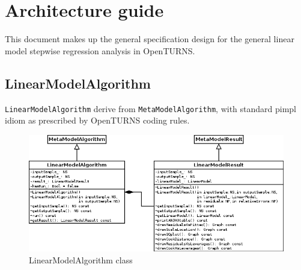 %

\section{Architecture guide}

This document makes up the general specification design for the general linear model stepwise regression analysis
in OpenTURNS.

\subsection{LinearModelAlgorithm}

\texttt{LinearModelAlgorithm} derive from \texttt{MetaModelAlgorithm}, with standard pimpl idiom
as prescribed by OpenTURNS coding rules.

\begin{figure}[htb]
  \begin{center}
    \includegraphics[scale=0.5]{LinearModelAlgorithm.png}
    \caption{LinearModelAlgorithm class}\label{fig:archi:LinearModelAlgorithm}
  \end{center}
\end{figure}

